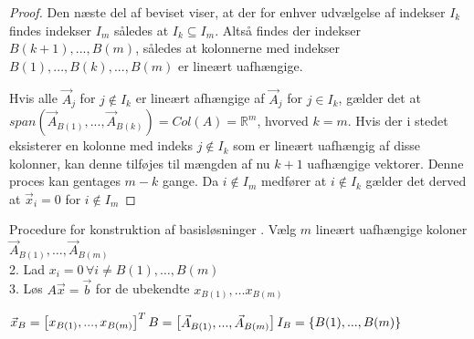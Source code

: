 \begin{proof}
Den næste del af beviset viser, at der for enhver udvælgelse af indekser $I_k$ findes indekser $I_m$ således at $I_k \subseteq I_m$. 
Altså findes der indekser $B(k+1),...,B(m)$, således at kolonnerne med indekser $B(1),...,B(k),...,B(m)$ er lineært uafhængige. 

Hvis alle $\vec{A}_j$ for $j \notin I_k$ er lineært afhængige af $\vec{A}_j$ for $j \in I_k$, gælder det at $span\left( \vec{A}_{B(1)},...,\vec{A}_{B(k)} \right)=Col(A)=\mathds{R}^m$, hvorved $k=m$. 
Hvis der i stedet eksisterer en kolonne med indeks $j \notin I_k$ som er lineært uafhængig af disse kolonner, kan denne tilføjes til mængden af nu $k+1$ uafhængige vektorer. Denne proces kan gentages $m-k$ gange. Da $i \notin I_m$ medfører at $i \notin I_k$ gælder det derved at $\vec{x}_i =0$ for $i \notin I_m$
\end{proof}

\begin{pro}{Procedure for konstruktion af basisløsninger}
. Vælg $m$ lineært uafhængige koloner $\vec{A}_{B(1)},\dots,\vec{A}_{B(m)}$\\
2. Lad $x_i=0 \,\forall i\neq B(1),\dots,B(m)$\\
3. Løs $A\vec{x}=\vec{b}$ for de ubekendte $x_{B(1)},\dots x_{B(m)}$
\end{pro}

\begin{defn}
$\vec{x}_B = \begin{bmatrix} x_{B(1)}, ..., x_{B(m)} \end{bmatrix}^T\\
B=\begin{bmatrix} \vec{A}_{B(1)},...,\vec{A}_{B(m)} \end{bmatrix}\\
I_B =\{B(1),...,B(m)\}$
\end{defn}


\begin{comment}
Der mangler bare generelt bindetekst mellem sætninger, fra at korollar 6.12 skal introduceres til at kapitlet skal afsluttes og føres videre til naboløsninger
\end{comment}





